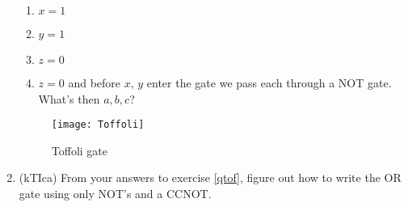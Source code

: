 \documentclass{article}
\begin{document}
\begin{enumerate}
\begin{enumerate}
		\item $x=1$
		\item $y=1$
		\item $z=0$
		\item $z=0$ and before $x,\,y$ enter the gate we pass each through a NOT gate. What's then $a,b,c$?
	\end{enumerate}
	\begin{figure}[h]
	\begin{center}
		\texttt{[image: Toffoli]}
		\caption{Toffoli gate}
		\label{toffoli}
	\end{center}
	\end{figure}
\item (kTIca) From your answers to exercise \ref{qtof}, figure out how to write the OR gate using only NOT's and a CCNOT.
\end{enumerate}
\end{document}
